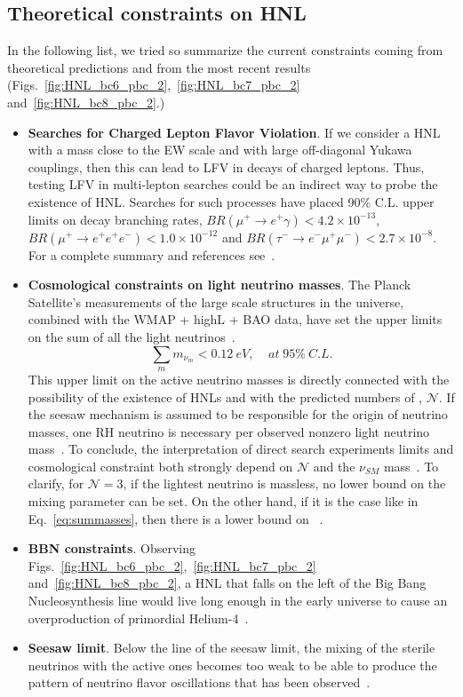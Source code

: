 \subsection{Theoretical constraints on HNL}
In the following list, we tried so summarize the current constraints
coming from theoretical predictions and from the most recent results (Figs.~\ref{fig:HNL_bc6_pbc_2},~\ref{fig:HNL_bc7_pbc_2}
and~\ref{fig:HNL_bc8_pbc_2}.)
\begin{itemize}
\item \textbf{Searches for Charged Lepton Flavor Violation}. If we consider a HNL with a
  mass close to the EW scale and with large off-diagonal Yukawa couplings,
  then this can lead to LFV in decays of charged leptons. Thus,
  testing LFV in multi-lepton searches could be an indirect way to
  probe the existence of HNL. Searches for such processes have
  placed 90\% C.L. upper limits on decay branching rates, \ie
  $BR(\mu^+\rightarrow e^+\gamma) < 4.2\times 10^{-13}$,
  $BR(\mu^+\rightarrow e^+e^+e^-) < 1.0\times 10^{-12}$ and
  $BR(\tau^-\rightarrow e^-\mu^+\mu^-) < 2.7\times 10^{-8}$. For a 
  complete summary and references see~\cite{Pascoli_2019}.
\item \textbf{Cosmological constraints on light neutrino masses}. The Planck
  Satellite's measurements of the large scale structures in the
  universe, combined with the WMAP + highL + BAO data, have set the
  upper limits on the sum of all the light
  neutrinos~\cite{Aghanim:2018eyx}.
\begin{equation}
\label{eq:summasses}
\sum_{m} m_{\nu_m} < 0.12 \: eV, \;\;\;\; at \;95\% \: C.L.
\end{equation}
This upper limit on the active neutrino masses is directly connected
with the possibility of the existence of HNLs and with the predicted
numbers of \hnl, $\mathcal{N}$.
If the seesaw mechanism is assumed to be responsible for the origin of neutrino masses,
one RH neutrino is necessary per observed nonzero light
neutrino mass~\cite{Alekhin_2016}.
To conclude, the interpretation of direct search experiments limits and cosmological constraint both strongly
depend on $\mathcal{N}$ and the $\nu_{SM}$
mass~\cite{DREWES2017250,drewes2015theoretical}. To clarify, for
$\mathcal{N}=3$, if the lightest neutrino is massless, no
lower bound on the mixing parameter \mixpar can be set.
On the other hand, if it is the case like in Eq.~\ref{eq:summasses}, then there is a lower
bound on \mixpar~\cite{DREWES2017250}.
\item \textbf{BBN constraints}. Observing
  Figs.~\ref{fig:HNL_bc6_pbc_2},~\ref{fig:HNL_bc7_pbc_2}
  and~\ref{fig:HNL_bc8_pbc_2}, a HNL that falls on the left of the
  Big Bang Nucleosynthesis line would live long enough in
  the early universe to cause an overproduction of primordial
  Helium-4~\cite{Ruchayskiy_2012}.
\item \textbf{Seesaw limit}. Below the line of the seesaw limit, the
  mixing of the sterile neutrinos with the active ones becomes too
  weak to be able to produce the pattern of neutrino flavor oscillations that has been observed~\cite{Canetti_2010}. 
\end{itemize}
\clearpage
